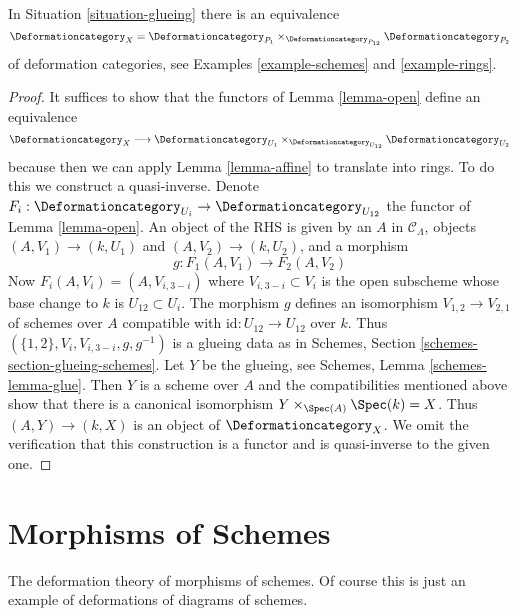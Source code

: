 \begin{lemma}
\label{lemma-glueing}
In Situation \ref{situation-glueing}
there is an equivalence
$$
\Deformationcategory_X =
\Deformationcategory_{P_1}
\times_{\Deformationcategory_{P_{12}}}
\Deformationcategory_{P_2}
$$
of deformation categories, see Examples \ref{example-schemes} and
\ref{example-rings}.
\end{lemma}

\begin{proof}
It suffices to show that the functors of Lemma \ref{lemma-open}
define an equivalence
$$
\Deformationcategory_X \longrightarrow
\Deformationcategory_{U_1}
\times_{\Deformationcategory_{U_{12}}}
\Deformationcategory_{U_2}
$$
because then we can apply Lemma \ref{lemma-affine} to translate into rings.
To do this we construct a quasi-inverse. Denote
$F_i : \Deformationcategory_{U_i} \to \Deformationcategory_{U_{12}}$
the functor of Lemma \ref{lemma-open}.
An object of the RHS is given by an $A$ in $\mathcal{C}_\Lambda$,
objects $(A, V_1) \to (k, U_1)$ and $(A, V_2) \to (k, U_2)$, and
a morphism
$$
g : F_1(A, V_1) \to F_2(A, V_2)
$$
Now $F_i(A, V_i) = (A, V_{i, 3 - i})$ where $V_{i, 3 - i} \subset V_i$
is the open subscheme whose base change to $k$ is $U_{12} \subset U_i$.
The morphism $g$ defines an isomorphism
$V_{1, 2} \to V_{2, 1}$ of schemes over $A$ compatible
with $\text{id} : U_{12} \to U_{12}$ over $k$.
Thus $(\{1, 2\}, V_i, V_{i, 3 - i}, g, g^{-1})$ is a glueing
data as in Schemes, Section \ref{schemes-section-glueing-schemes}.
Let $Y$ be the glueing, see Schemes, Lemma \ref{schemes-lemma-glue}.
Then $Y$ is a scheme over $A$ and the
compatibilities mentioned above show that
there is a canonical isomorphism
$Y \times_{\Spec(A)} \Spec(k) = X$.
Thus $(A, Y) \to (k, X)$ is an object of $\Deformationcategory_X$.
We omit the verification that this construction is a functor
and is quasi-inverse to the given one.
\end{proof}






\section{Morphisms of Schemes}
\label{section-schemes-morphisms}

\noindent
The deformation theory of morphisms of schemes.
Of course this is just an example of
deformations of diagrams of schemes.

